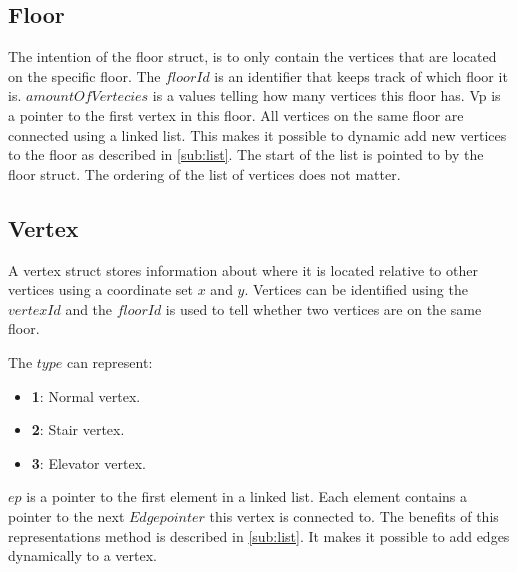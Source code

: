 \begin{minipage}{\linewidth}
\subsection{Floor} \label{subsub:floor}
The intention of the floor struct, is to only contain the vertices that are located on the specific floor. The $floorId$ is an identifier that keeps track of which floor it is. $amountOfVertecies$ is a values telling how many vertices this floor has. Vp is a pointer to the first vertex in this floor. All vertices on the same floor are connected using a linked list. This makes it possible to dynamic add new vertices to the floor as described in \cref{sub:list}. The start of the list is pointed to by the floor struct. The ordering of the list of vertices does not matter.

 \label{Floor_struct}
\end{minipage}

\begin{minipage}{\linewidth}
\subsection{Vertex}\label{data_struct:vertex}
A vertex struct stores information about where it is located relative to other vertices using a coordinate set $x$ and $y$. Vertices can be identified using the $vertexId$ and the $floorId$ is used to tell whether two vertices are on the same floor.

 The $type$ can represent:
\begin{itemize}[noitemsep]
	\item \textbf{1}: Normal vertex.
	\item \textbf{2}: Stair vertex.
	\item \textbf{3}: Elevator vertex.
\end{itemize}

$ep$ is a pointer to the first element in a linked list. Each element contains a pointer to the next $Edge pointer$ this vertex is connected to. The benefits of this representations method is described in \cref{sub:list}. It makes it possible to add edges dynamically to a vertex.




 \label{vertex_struct}
\end{minipage}

